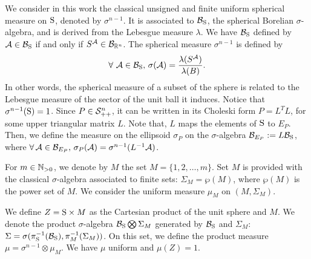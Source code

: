 We consider in this work the classical unsigned and finite uniform spherical measure on $\text{S}$, denoted by $\sigma^{n-1}$. It is associated to $\mathcal{B}_{\text{S}}$, the spherical Borelian $\sigma$-algebra, and is derived from the Lebesgue measure $\lambda$. We have $\mathcal{B}_{\text{S}}$ defined by $\mathcal{A} \in \mathcal{B}_{\text{S}}$ if and only if $S^{\mathcal{A}} \in \mathcal{B}_{\mathbb{R}^n}$. The spherical measure $\sigma^{n-1}$ is defined by
$$\forall\ \mathcal{A} \in \mathcal{B}_{\text{S}},\, \sigma(\mathcal{A}) = \frac{\lambda(S^{\mathcal{A}})}{\lambda(B)}. $$
In other words, the spherical measure of a subset of the sphere is related to the Lebesgue measure of the sector of the unit ball it induces. Notice that $\sigma^{n-1}(\text{S}) = 1$.
Since $P \in \mathcal{S}_{++}^n$, it can be written in its Choleski form $P = L^TL$, for some upper triangular matrix $L$. Note that, $L$ maps the elements of $\text{S}$ to $E_P$. Then, we define the measure on the ellipsoid $\sigma_P$ on the $\sigma$-algebra $\mathcal{B}_{E_P}:=L\mathcal{B}_{\text{S}}$, where $\forall\, \mathcal{A} \in \mathcal{B}_{E_P},\, \sigma_P({\mathcal{A}}) = \sigma^{n-1}(L^{-1}\mathcal{A})$.
%
%
%


For $m \in \mathbb{N}_{>0}$, we denote by $M$ the set $M=\{1,2, \ldots,m \}$. Set $M$ is provided with the classical $\sigma$-algebra associated to finite sets: $\Sigma_M = \wp(M)$, where $\wp(M)$ is the power set of $M$. We consider the uniform measure $\mu_M$ on $(M, \Sigma_M)$. 

We define $Z = \text{S} \times M$ as the Cartesian product of the unit sphere and $M$. We denote the product $\sigma$-algebra $\mathcal{B}_{\text{S}} \bigotimes \Sigma_M$ generated by $\mathcal{B}_{\text{S}}$ and $\Sigma_M$: $\Sigma = \sigma( \pi_{\text{S}}^{-1}(\mathcal{B}_{\text{S}}),  \pi_{M}^{-1}(\Sigma_M))$. On this set, we define the product measure $\mu = \sigma^{n-1} \otimes \mu_M$. We have $\mu$ uniform and $\mu(Z)=1$.  
